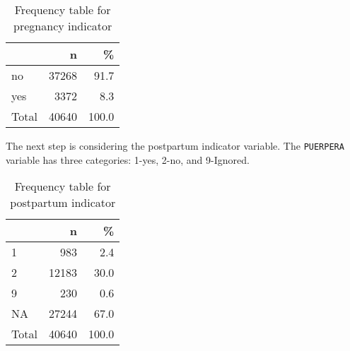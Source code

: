 \documentclass[
]{article}
\newenvironment{Shaded}{\begin{snugshade}}{\end{snugshade}}
\newcommand{\DataTypeTok}[1]{\textcolor[rgb]{0.13,0.29,0.53}{#1}}
\newcommand{\DecValTok}[1]{\textcolor[rgb]{0.00,0.00,0.81}{#1}}
\newcommand{\KeywordTok}[1]{\textcolor[rgb]{0.13,0.29,0.53}{\textbf{#1}}}
\newcommand{\NormalTok}[1]{#1}
\newcommand{\OperatorTok}[1]{\textcolor[rgb]{0.81,0.36,0.00}{\textbf{#1}}}
\newcommand{\OtherTok}[1]{\textcolor[rgb]{0.56,0.35,0.01}{#1}}
\newcommand{\StringTok}[1]{\textcolor[rgb]{0.31,0.60,0.02}{#1}}
\begin{document}
\begin{table}[!h]

\caption{\label{tab:unnamed-chunk-18}Frequency table for pregnancy indicator}
\centering
\begin{tabular}[t]{l|r|r}
\hline
  & n & \%\\
\hline
no & 37268 & 91.7\\
\hline
yes & 3372 & 8.3\\
\hline
Total & 40640 & 100.0\\
\hline
\end{tabular}
\end{table}

The next step is considering the postpartum indicator variable. The
\texttt{PUERPERA} variable has three categories: 1-yes, 2-no, and
9-Ignored.

\begin{Shaded}
\end{Shaded}

\begin{table}[!h]

\caption{\label{tab:unnamed-chunk-19}Frequency table for postpartum indicator}
\centering
\begin{tabular}[t]{l|r|r}
\hline
  & n & \%\\
\hline
1 & 983 & 2.4\\
\hline
2 & 12183 & 30.0\\
\hline
9 & 230 & 0.6\\
\hline
NA & 27244 & 67.0\\
\hline
Total & 40640 & 100.0\\
\hline
\end{tabular}
\end{table}
\end{document}
